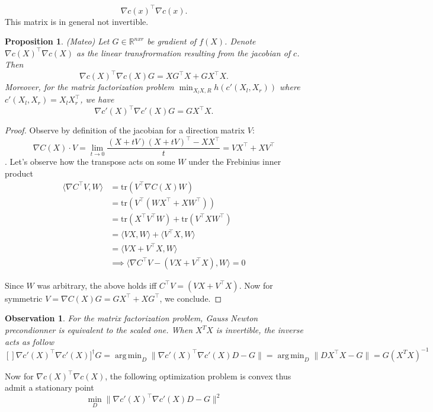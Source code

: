 \documentclass{article}
\newtheorem{proposition}{Proposition}
\newtheorem{observation}{Observation}
\DeclareMathOperator*{\argmin}{arg\,min}
\begin{document}
$$
\nabla c(x)^\top \nabla c(x).
$$
This matrix is in general not invertible.


\begin{proposition} (Mateo)
    Let $G \in \mathbb{R}^{nxr}$ be gradient of $f(X)$. Denote $\nabla c(X)^\top \nabla c(X)$ as the linear transfrormation resulting from the jacobian of $c$. Then
    $$
     \nabla c(X)^\top \nabla c(X) G = XG^\top X + GX^\top X. 
    $$ Moreover, for the matrix factorization problem $\min_{X_l X,R} h(c'(X_l,X_r)) $ where $c'(X_l,X_r) = X_l X_r^\top$, we have  
    $$
    \nabla c'(X)^\top \nabla c'(X) G = GX^\top X. 
    $$
    
\end{proposition}
\begin{proof}
    Observe by definition of the jacobian for a direction matrix $V$: $$\nabla C(X) \cdot  V =  \lim_{t\to 0}  \frac{(X+tV)(X+tV)^\top - XX^\top   }{t} = VX^\top + XV^\top$$.
    Let's observe how the transpose acts on some $W$ under the Frebinius inner product
\begin{align*}
    \langle \nabla C^\top V, W \rangle & = \text{tr}(V^\top \nabla C(X) W) \\
    & = \text{tr}( V^\top (WX^\top + XW^\top)) \\
    & = \text{tr}(X^\top V^\top W) + \text{tr}(V^\top X W^\top) \\
    & = \langle V X, W \rangle + \langle V^\top X, W \rangle \\
    & = \langle VX + V^\top X, W \rangle \\
    & \implies \langle \nabla C^\top V -  (VX + V^\top X), W \rangle = 0
\end{align*}

    Since $W$ was arbitrary, the above holds iff $ C^\top V = (V X + V^\top X)$. Now for symmetric $V= \nabla C(X) G = GX^\top + X G^\top$, we conclude.
\end{proof}


\begin{observation}
For the matrix factorization problem, Gauss Newton precondionner is equivalent to the scaled one. When $X^TX$ is invertible, the inverse acts as follow
$$
[] \nabla c'(X)^\top \nabla c'(X) ]^{\dagger} G = \argmin_{D} \| \nabla c'(X)^\top \nabla c'(X) D - G \| = \argmin_{D} \| DX^\top X - G \|  = G(X^TX)^{-1}
$$
\end{observation}

Now for $\nabla c(X)^\top \nabla c(X)$, the following optimization problem is convex thus admit a stationary point 
$$
\min_{D} \| \nabla c'(X)^\top \nabla c'(X) D - G \|^2
$$
\end{document}
